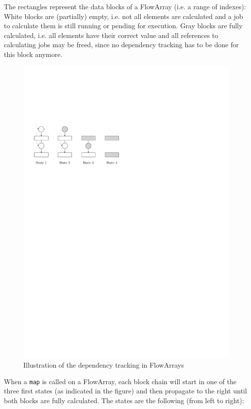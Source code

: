\documentclass[runningheads,a4paper,fleqn]{llncs}
\begin{document}
The rectangles represent the data blocks of a FlowArray (i.e. a range
of indexes): White blocks are (partially) empty, i.e. not all elements
are calculated and a job to calculate them is still running or pending
for execution. Gray blocks are fully calculated, i.e. all elements
have their correct value and all references to calculating jobs may be
freed, since no dependency tracking has to be done for this block
anymore.

\begin{figure}
  \centering
  \includegraphics{dependency-tracking}
  \caption{Illustration of the dependency tracking in FlowArrays}
  \label{fig:dep-track}
\end{figure}

When a \texttt{map} is called on a FlowArray, each block chain will
start in one of the three first states (as indicated in the figure)
and then propagate to the right until both blocks are fully
calculated. The states are the following (from left to right):
\end{document}
